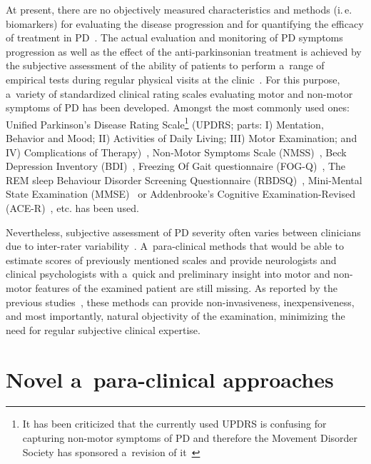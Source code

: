 At present, there are no objectively measured characteristics and methods (i.\,e. biomarkers) for evaluating the disease progression and for quantifying the efficacy of treatment in PD~\cite{Antoniades2008}. The actual evaluation and monitoring of PD symptoms progression as well as the effect of the anti-parkinsonian treatment is achieved by the subjective assessment of the ability of patients to perform a~range of empirical tests during regular physical visits at the clinic~\cite{factor2007}. For this purpose, a~variety of standardized clinical rating scales evaluating motor and non-motor symptoms of PD has been developed. Amongst the most commonly used ones: Unified Parkinson's Disease Rating Scale\footnote{It has been criticized that the currently used UPDRS is confusing for capturing non-motor symptoms of PD and therefore the Movement Disorder Society has sponsored a~revision of it~\cite{Goetz2007}} (UPDRS; parts: I) Mentation, Behavior and Mood; II) Activities of Daily Living; III) Motor Examination; and IV) Complications of Therapy)~\cite{Fahn1987}, Non-Motor Symptoms Scale (NMSS)~\cite{Chaudhuri2007}, Beck Depression Inventory (BDI)~\cite{Beck2000, Beck1961}, Freezing Of Gait questionnaire (FOG-Q)~\cite{Giladi2000}, The REM sleep Behaviour Disorder Screening Questionnaire (RBDSQ)~\cite{Stiasny2007}, Mini-Mental State Examination (MMSE)~\cite{Folstein1975} or Addenbrooke's Cognitive Examination-Revised (ACE-R)~\cite{Larner2007}, etc. has been used.

Nevertheless, subjective assessment of PD severity often varies between clinicians due to inter-rater variability~\cite{Ramaker2002, Post2005}. A~para-clinical methods that would be able to estimate scores of previously mentioned scales and provide neurologists and clinical psychologists with a~quick and preliminary insight into motor and non-motor features of the examined patient are still missing. As reported by the previous studies~\cite{Tsanas2010, Tsanas2010b}, these methods can provide non-invasiveness, inexpensiveness, and most importantly, natural objectivity of the examination, minimizing the need for regular subjective clinical expertise.

\section{Novel a~para-clinical approaches}
\label{ch2_3}

